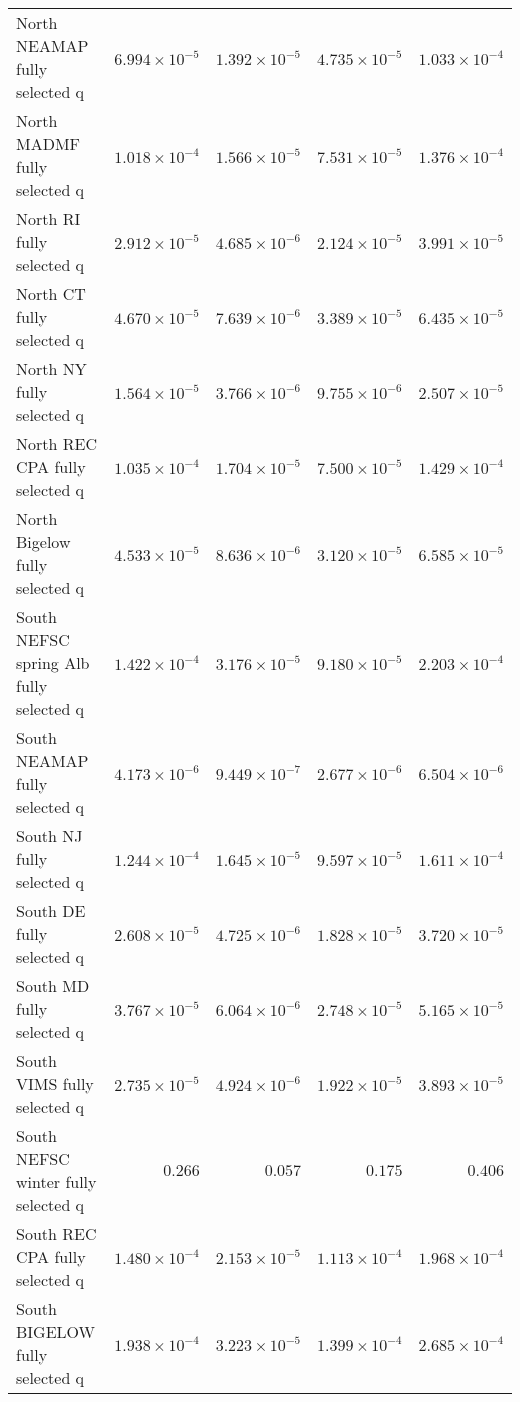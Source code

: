 \documentclass[
]{article}
\begin{document}
\begin{landscape}
\begin{longtable}[t]{lrrrr}
\addlinespace
North NEAMAP fully selected q & $6.994\times 10^{-5}$ & $1.392\times 10^{-5}$ & $4.735\times 10^{-5}$ & $1.033\times 10^{-4}$\\
North MADMF fully selected q & $1.018\times 10^{-4}$ & $1.566\times 10^{-5}$ & $7.531\times 10^{-5}$ & $1.376\times 10^{-4}$\\
North RI fully selected q & $2.912\times 10^{-5}$ & $4.685\times 10^{-6}$ & $2.124\times 10^{-5}$ & $3.991\times 10^{-5}$\\
North CT fully selected q & $4.670\times 10^{-5}$ & $7.639\times 10^{-6}$ & $3.389\times 10^{-5}$ & $6.435\times 10^{-5}$\\
North NY fully selected q & $1.564\times 10^{-5}$ & $3.766\times 10^{-6}$ & $9.755\times 10^{-6}$ & $2.507\times 10^{-5}$\\
\addlinespace
North REC CPA fully selected q & $1.035\times 10^{-4}$ & $1.704\times 10^{-5}$ & $7.500\times 10^{-5}$ & $1.429\times 10^{-4}$\\
North Bigelow fully selected q & $4.533\times 10^{-5}$ & $8.636\times 10^{-6}$ & $3.120\times 10^{-5}$ & $6.585\times 10^{-5}$\\
South NEFSC spring Alb fully selected q & $1.422\times 10^{-4}$ & $3.176\times 10^{-5}$ & $9.180\times 10^{-5}$ & $2.203\times 10^{-4}$\\
South NEAMAP fully selected q & $4.173\times 10^{-6}$ & $9.449\times 10^{-7}$ & $2.677\times 10^{-6}$ & $6.504\times 10^{-6}$\\
South NJ fully selected q & $1.244\times 10^{-4}$ & $1.645\times 10^{-5}$ & $9.597\times 10^{-5}$ & $1.611\times 10^{-4}$\\
\addlinespace
South DE fully selected q & $2.608\times 10^{-5}$ & $4.725\times 10^{-6}$ & $1.828\times 10^{-5}$ & $3.720\times 10^{-5}$\\
South MD fully selected q & $3.767\times 10^{-5}$ & $6.064\times 10^{-6}$ & $2.748\times 10^{-5}$ & $5.165\times 10^{-5}$\\
South VIMS fully selected q & $2.735\times 10^{-5}$ & $4.924\times 10^{-6}$ & $1.922\times 10^{-5}$ & $3.893\times 10^{-5}$\\
South NEFSC winter fully selected q & $0.266$ & $0.057$ & $0.175$ & $0.406$\\
South REC CPA fully selected q & $1.480\times 10^{-4}$ & $2.153\times 10^{-5}$ & $1.113\times 10^{-4}$ & $1.968\times 10^{-4}$\\
\addlinespace
South BIGELOW fully selected q & $1.938\times 10^{-4}$ & $3.223\times 10^{-5}$ & $1.399\times 10^{-4}$ & $2.685\times 10^{-4}$\\

\end{longtable}
\end{landscape}
\end{document}
